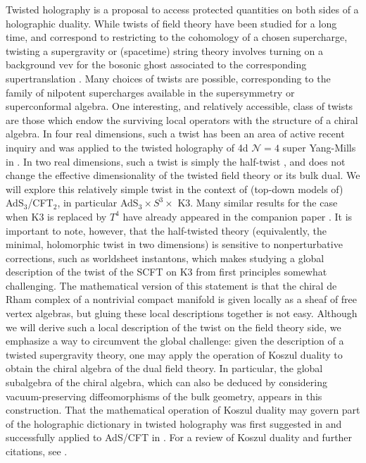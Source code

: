 \documentclass[11pt]{amsart}
\begin{document}
Twisted holography \cite{CLsugra, CostelloGaiotto, CP} is a proposal to access protected quantities on both sides of a holographic duality. While twists of field theory have been studied for a long time, and correspond to restricting to the cohomology of a chosen supercharge, twisting a supergravity or (spacetime) string theory involves turning on a background vev for the bosonic ghost associated to the corresponding supertranslation \cite{CLsugra}. Many choices of twists are possible, corresponding to the family of nilpotent supercharges available in the supersymmetry or superconformal algebra. One interesting, and relatively accessible, class of twists are those which endow the surviving local operators with the structure of a chiral algebra. In four real dimensions, such a twist has been an area of active recent inquiry \cite{Beem:2013sza} and was applied to the twisted holography of 4d $\mathcal{N}=4$ super Yang-Mills in \cite{CostelloGaiotto}. In two real dimensions, such a twist is simply the half-twist \cite{Witten, Kapustin}, and does not change the effective dimensionality of the twisted field theory or its bulk dual. We will explore this relatively simple twist in the context of (top-down models of) AdS$_3$/CFT$_2$, in particular AdS$_3 \times S^3 \times$ K3. Many similar results for the case when K3 is replaced by $T^4$ have already appeared in the companion paper \cite{CP}. 
It is important to note, however, that the half-twisted theory (equivalently, the minimal, holomorphic twist in two dimensions) is sensitive to nonperturbative corrections, such as worldsheet instantons, which makes studying a global description of the twist of the SCFT on K3 from first principles somewhat challenging. The mathematical version of this statement is that the chiral de Rham complex of a nontrivial compact manifold is given locally as a sheaf of free vertex algebras, but gluing these local descriptions together is not easy. Although we will derive such a local description of the twist on the field theory side, we emphasize a way to circumvent the global challenge: given the description of a twisted supergravity theory, one may apply the operation of Koszul duality to obtain the chiral algebra of the dual field theory. In particular, the global subalgebra of the chiral algebra, which can also be deduced by considering vacuum-preserving diffeomorphisms of the bulk geometry, appears in this construction. That the mathematical operation of Koszul duality may govern part of the holographic dictionary in twisted holography was first suggested in \cite{CostelloM2} and successfully applied to AdS/CFT in \cite{CP}. For a review of Koszul duality and further citations, see \cite{PW}.
\end{document}
